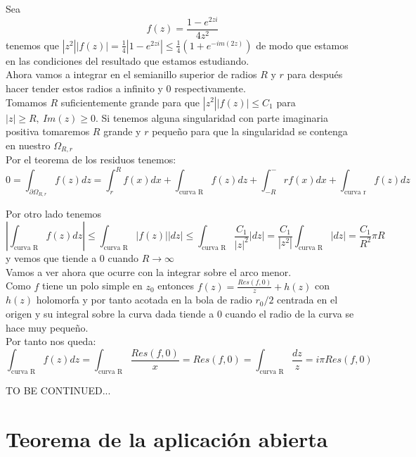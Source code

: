 \documentclass{apuntes}
\begin{document}
\begin{enumerate}
\begin{enumerate}
\begin{example}
Sea
\[f(z)=\frac{1-e^{2zi}}{4z^2}\]
tenemos que $|z^2||f(z)|=\frac{1}{4}|1-e^{2zi}| \leq \frac{1}{4}(1+e^{-im(2z)})$ de modo que estamos en las condiciones del resultado que estamos estudiando.\\

Ahora vamos a integrar en el semianillo superior de radios $R$ y $r$ para después hacer tender estos radios a infinito y 0 respectivamente.\\

Tomamos $R$ suficientemente grande para que $|z^2||f(z)| \leq C_1$ para $|z|\geq R, \ Im(z)\geq 0$. Si tenemos alguna singularidad con parte imaginaria positiva tomaremos $R$ grande y $r$ pequeño para que la singularidad se contenga en nuestro $Ω_{R,r}$\\

Por el teorema de los residuos tenemos:
\[0 = \int_{\partial Ω_{R,r}} f(z)dz = \int_r^R f(x)dx +\int_{\text{curva R}}f(z)dz + \int_{-R}^-r f(x)dx + \int_{\text{curva r}} f(z)dz\]

Por otro lado tenemos
\[\left|\int_{\text{curva R}}f(z)dz \right| \leq \int_{\text{curva R}}|f(z)||dz| \leq \int_{\text{curva R}}\frac{C_1}{|z|^2}|dz| = \frac{C_1}{|z^2|}\int_{\text{curva R}}|dz|=\frac{C_1}{R^2}πR \]
y vemos que tiende a 0 cuando $R \to \infty$\\

Vamos a ver ahora que ocurre con la integrar sobre el arco menor.\\

Como $f$ tiene un polo simple en $z_0$ entonces $f(z)=\frac{Res(f,0)}{z}+h(z)$ con $h(z)$ holomorfa y por tanto acotada en la bola de radio $r_0/2$ centrada en el origen y su integral sobre la curva dada tiende a 0 cuando el radio de la curva se hace muy pequeño.\\

Por tanto nos queda:
\[\int_{\text{curva R}} f(z)dz = \int_{\text{curva R}} \frac{Res(f,0)}{x} = Res(f,0)=\int_{\text{curva R}} \frac{dz}{z}=iπRes(f,0)\]

TO BE CONTINUED...



\end{example}
\end{enumerate}
\end{enumerate}

\section{Teorema de la aplicación abierta}
\end{document}
